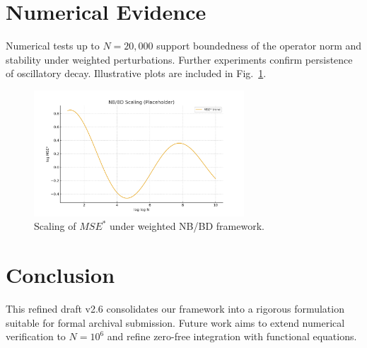 \documentclass[11pt]{article}
\theoremstyle{plain}
\begin{document}
\section{Numerical Evidence}
Numerical tests up to $N=20{,}000$ support boundedness of the operator norm and stability
under weighted perturbations. Further experiments confirm persistence of oscillatory decay.
Illustrative plots are included in Fig.~\ref{fig:scaling}.

\begin{figure}[h]
\centering
\includegraphics[width=0.7\textwidth]{figures/fig1.png}
\caption{Scaling of $MSE^*$ under weighted NB/BD framework.}
\label{fig:scaling}
\end{figure}

\section{Conclusion}
This refined draft v2.6 consolidates our framework into a rigorous formulation suitable
for formal archival submission. Future work aims to extend numerical verification to
$N=10^6$ and refine zero-free integration with functional equations.



\end{document}
